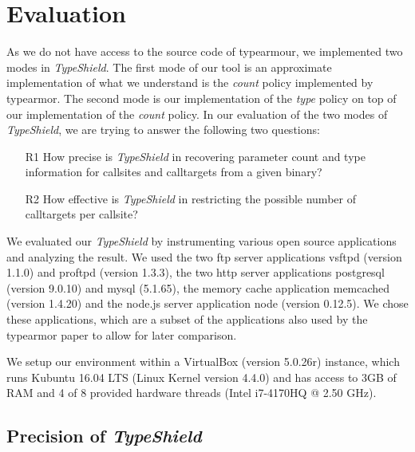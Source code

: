 \section{Evaluation}
\label{chapter:Evaluation}
As we do not have access to the source code of typearmour, we implemented two modes in \textit{TypeShield}. The first mode of our tool is an approximate implementation of what we understand is the \textit{count} policy implemented by typearmor. The second mode is our implementation of the \textit{type} policy on top of our implementation of the \textit{count} policy. In our evaluation of the two modes of \textit{TypeShield}, we are trying to answer the following two questions:
\begin{enumerate}

 \item[R1] How precise is \textit{TypeShield} in recovering parameter count and type information for callsites and calltargets from a given binary?

 \item[R2] How effective is \textit{TypeShield} in restricting the possible number of calltargets per callsite?

%
%

\end{enumerate}
We evaluated our \textit{TypeShield} by instrumenting various open source applications and analyzing the result. We used the two ftp server applications vsftpd (version 1.1.0) and proftpd (version 1.3.3), the two http server applications postgresql (version 9.0.10) and  mysql (5.1.65), the memory cache application memcached (version 1.4.20) and the node.js server application node (version 0.12.5). We chose these applications, which are a subset of the applications also used by the typearmor paper\cite{veen:typearmor} to allow for later comparison.

We setup our environment within a VirtualBox (version 5.0.26r) instance, which runs Kubuntu 16.04 LTS (Linux Kernel version 4.4.0) and has access to 3GB of RAM and 4 of 8 provided hardware threads (Intel i7-4170HQ @ 2.50 GHz).

\subsection{Precision of \textit{TypeShield}}
\label{section:typeshieldprecision}

